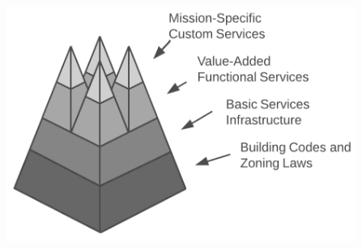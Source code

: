 \documentclass[xetex,mathserif,serif]{beamer}
\begin{document}
\begin{frame}
\begin{columns}
\begin{column}{0.4\textwidth}
\begin{center}
                    \includegraphics[width=\textwidth]{noIslandOfAutomation.png}
                \end{center}	
            \end{column}
        \end{columns}
    \end{frame}
\end{document}
